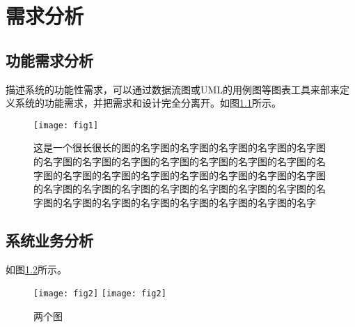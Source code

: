 

\chapter{需求分析}

\section{功能需求分析}
描述系统的功能性需求，可以通过数据流图或UML的用例图等图表工具来部来定义系统的功能需求，并把需求和设计完全分离开。如图\ref{fig:single}所示。




\begin{figure}[H]
	\centering 
	\texttt{[image: fig1]} 
	\caption{这是一个很长很长的图的名字图的名字图的名字图的名字图的名字图的名字图的名字图的名字图的名字图的名字图的名字图的名字图的名字图的名字图的名字图的名字图的名字图的名字图的名字图的名字图的名字图的名字图的名字图的名字图的名字图的名字图的名字图的名字图的名字图的名字图的名字图的名字图的名字图的名字图的名字}
	\label{fig:single}
\end{figure}


\section{系统业务分析}
如图\ref{fig:double}所示。

\begin{figure}[H]
	\centering
    \texttt{[image: fig2]}
    \quad %
    \texttt{[image: fig2]} 
	\caption{两个图}
	\label{fig:double}
\end{figure}

